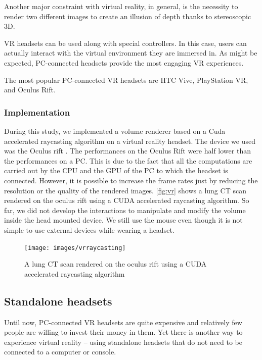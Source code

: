 Another major constraint with virtual reality, in general, is the necessity to render two different images to create an illusion of depth thanks to stereoscopic 3D.


VR headsets can be used along with special controllers. In this case, users can actually interact with the virtual environment they are immersed in. As might be expected, PC-connected headsets provide the most engaging VR experiences.

The most popular PC-connected VR headsets are HTC Vive, PlayStation VR, and Oculus Rift.

\subsubsection{Implementation}

During this study, we implemented a volume renderer based on a Cuda accelerated raycasting algorithm on a virtual reality headset. The device we used was the Oculus rift \cite{oculus}. The performances on the Oculus Rift were half lower than the performances on a PC. This is due to the fact that all the computations are carried out by the CPU and the GPU of the PC to which the headset is connected.  However, it is possible to increase the frame rates just by reducing the resolution or the quality of the rendered images. \autoref{fig:vr} shows a lung  CT scan rendered on the oculus rift using a CUDA accelerated raycasting algorithm. So far, we did not develop the interactions to manipulate and modify the volume inside the head mounted device. We still use the mouse even though it is not simple to use external devices while wearing a headset.


\begin{figure}
\centering
\texttt{[image: images/vrraycasting]}
\caption{A lung CT scan rendered on the oculus rift using a CUDA accelerated raycasting algorithm }
\label{fig:vr}
\end{figure}



\subsection{Standalone headsets}

Until now, PC-connected VR headsets are quite expensive and relatively few people are willing to invest their money in them. Yet there is another way to experience virtual reality – using standalone headsets that do not need to be connected to a computer or console.

